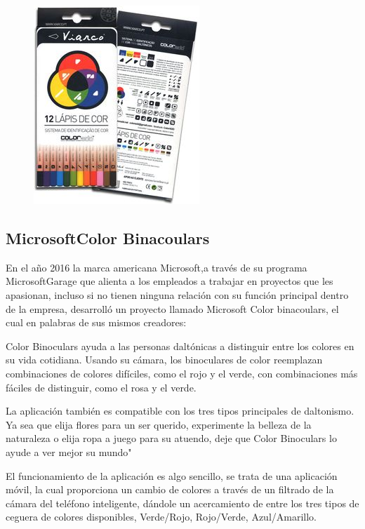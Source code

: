 \documentclass[10pt]{article}
\begin{document}
\begin{figure}[H]
	\begin{center}
\includegraphics[scale = 0.45]{Imagenes/coloradd.jpg}
	\end{center} 
\end{figure}

\subsection{Microsoft\textregistered \space Color Binacoulars }
En el año 2016 la marca americana Microsoft\textregistered,\space a través de su programa Microsoft\textregistered \space Garage que alienta a los empleados a trabajar en proyectos que les apasionan, incluso si no tienen ninguna relación con su función principal dentro de la empresa, desarrolló un proyecto llamado Microsoft Color binacoulars, el cual en palabras de sus mismos creadores:

\setlength{\parskip}{2mm}

Color Binoculars ayuda a las personas daltónicas a distinguir entre los colores en su vida cotidiana. Usando su cámara, los binoculares de color reemplazan combinaciones de colores difíciles, como el rojo y el verde, con combinaciones más fáciles de distinguir, como el rosa y el verde.

\setlength{\parskip}{2mm}

La aplicación también es compatible con los tres tipos principales de daltonismo. Ya sea que elija flores para un ser querido, experimente la belleza de la naturaleza o elija ropa a juego para su atuendo, deje que Color Binoculars lo ayude a ver mejor su mundo"

\setlength{\parskip}{2mm}

El funcionamiento de la aplicación es algo sencillo, se trata de una aplicación móvil, la cual proporciona un cambio de colores a través de un filtrado de la cámara del teléfono inteligente, dándole un acercamiento de entre los tres tipos de ceguera de colores disponibles, Verde/Rojo, Rojo/Verde, Azul/Amarillo.
\end{document}
